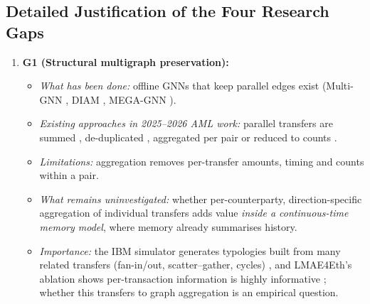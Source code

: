 \documentclass[11pt,a4paper]{article}
\begin{document}
\subsection{Detailed Justification of the Four Research Gaps}
\label{sec:gap_justification}
\begin{enumerate}[leftmargin=*]
    \item \textbf{G1 (Structural multigraph preservation):}
    \begin{itemize}[leftmargin=*]
        \item \textit{What has been done:} offline GNNs that keep parallel edges exist (Multi-GNN \cite{egressy2024multigraph}, DIAM \cite{ding2024diam}, MEGA-GNN \cite{bilgi2026mega}).
        \item \textit{Existing approaches in 2025--2026 AML work:} parallel transfers are summed \cite{tian2025kar}, de-duplicated \cite{alemari2026explainable}, aggregated per pair \cite{rico2026taml} or reduced to counts \cite{jia2025lmae4eth}.
        \item \textit{Limitations:} aggregation removes per-transfer amounts, timing and counts within a pair.
        \item \textit{What remains uninvestigated:} whether per-counterparty, direction-specific aggregation of individual transfers adds value \emph{inside a continuous-time memory model}, where memory already summarises history.
        \item \textit{Importance:} the IBM simulator generates typologies built from many related transfers (fan-in/out, scatter--gather, cycles) \cite{altman2023ibmaml}, and LMAE4Eth's ablation shows per-transaction information is highly informative \cite{jia2025lmae4eth}; whether this transfers to graph aggregation is an empirical question.
    \end{itemize}


\end{enumerate}
\end{document}
